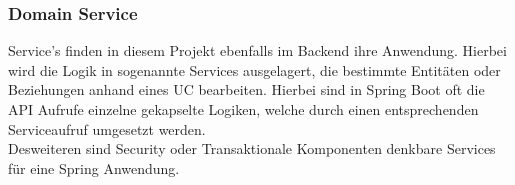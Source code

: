 			\subsubsection{Domain Service}
			Service's finden in diesem Projekt ebenfalls im Backend ihre Anwendung. Hierbei wird die Logik in sogenannte Services ausgelagert, die bestimmte Entitäten oder Beziehungen anhand eines \ac{UC} bearbeiten. Hierbei sind in Spring Boot oft die \ac{API} Aufrufe einzelne gekapselte Logiken, welche durch einen entsprechenden Serviceaufruf umgesetzt werden. \\ 
			Desweiteren sind Security oder Transaktionale Komponenten denkbare Services für eine Spring Anwendung.